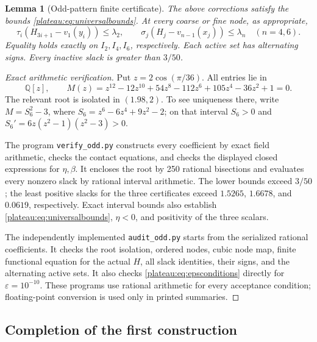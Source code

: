 \documentclass[11pt]{article}
\newtheorem{lemma}[theorem]{Lemma}
\theoremstyle{remark}\newtheorem{remark}[theorem]{Remark}
\newcommand{\Q}{\mathbb Q}
\newcommand{\eps}{\varepsilon}
\begin{document}
\begin{lemma}[Odd-pattern finite certificate]\label{plateau:lem:oddcertificate}
The above corrections satisfy the bounds \eqref{plateau:eq:universalbounds}.
At every coarse or fine node, as appropriate,
\[
 \tau_i(H_{3i+1}-v_1(y_i))\le\lambda_2,
 \qquad
 \sigma_j(H_j-v_{n-1}(x_j))\le\lambda_n\quad(n=4,6).
\]
Equality holds exactly on $I_2,I_4,I_6$, respectively. Each active set has
alternating signs. Every inactive slack is greater than $3/50$.
\end{lemma}
\begin{proof}[Exact arithmetic verification]
Put $z=2\cos(\pi/36)$. All entries lie in
\[
 \Q[z],\qquad
 M(z)=z^{12}-12z^{10}+54z^8-112z^6+105z^4-36z^2+1=0.
\]
The relevant root is isolated in $(1.98,2)$. To see uniqueness there, write
$M=S_6^2-3$, where $S_6=z^6-6z^4+9z^2-2$; on that interval
$S_6>0$ and $S_6'=6z(z^2-1)(z^2-3)>0$.

The program \texttt{verify\_odd.py} constructs every coefficient by exact
field arithmetic, checks the contact equations, and checks the displayed
closed expressions for $\eta,\beta$. It encloses the root by 250 rational
bisections and evaluates every nonzero slack by rational interval
arithmetic. The lower bounds exceed $3/50$; the least positive slacks for
the three certificates exceed $1.5265$, $1.6678$, and $0.0619$,
respectively. Exact interval bounds also establish
\eqref{plateau:eq:universalbounds}, $\eta<0$, and positivity of the three scalars.

The independently implemented \texttt{audit\_odd.py} starts from the
serialized rational coefficients. It checks the root isolation, ordered
nodes, cubic node map, finite functional equation for the actual $H$,
all slack identities, their signs, and the alternating active sets. It
also checks \eqref{plateau:eq:epsconditions} directly for $\eps=10^{-10}$.
These programs use rational arithmetic for every acceptance condition;
floating-point conversion is used only in printed summaries.
\end{proof}

\subsection{Completion of the first construction}
\end{document}
